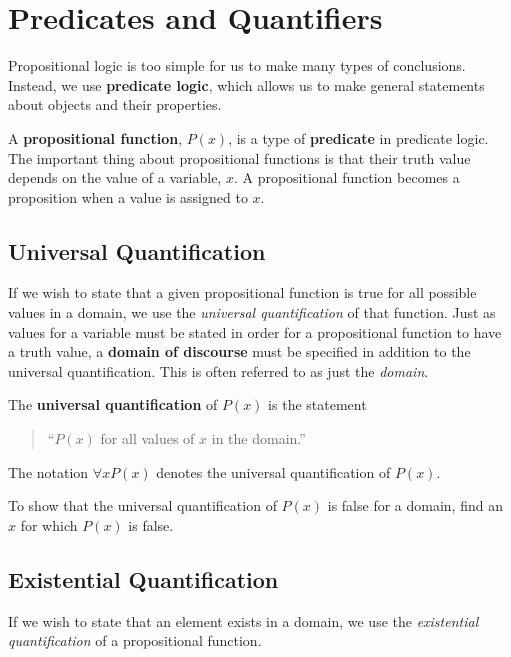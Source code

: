 \chapter{Predicates and Quantifiers}

Propositional logic is too simple for us to make many types of conclusions.
Instead, we use \textbf{predicate logic}, which allows us to make general
statements about objects and their properties.

A \textbf{propositional function}, $P(x)$, is a
type of \textbf{predicate} in
predicate logic. The important thing about propositional functions is that their
truth value depends on the value of a variable, $x$. A propositional function
becomes a proposition when a value is assigned to $x$.

\section{Universal Quantification}

If we wish to state that a given propositional function is true for all possible
values in a domain, we use the \emph{universal quantification} of that function.
Just as values for a variable must be stated in order for a propositional
function to have a truth value, a \textbf{domain of discourse} must be specified
in addition to the universal quantification. This is often referred to as just
the \emph{domain}.

\begin{defn}
  The \textbf{universal quantification} of $P(x)$ is the statement
  \begin{quote}
    ``$P(x)$ for all values of $x$ in the domain.''
  \end{quote}
  The notation $\forall x P(x)$ denotes the universal quantification of
  $P(x)$.\cite[p.~40]{rosen}
\end{defn}

To show that the universal quantification of $P(x)$ is false for a domain, find
an $x$ for which $P(x)$ is false.

\section{Existential Quantification}

If we wish to state that an element exists in a domain, we use the
\emph{existential quantification} of a propositional function.

